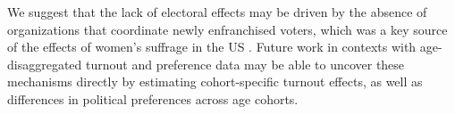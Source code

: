 We suggest that the lack of electoral effects may be driven by the
absence of organizations that coordinate newly enfranchised voters,
which was a key source of the effects of women's suffrage in the US
\parencite{Morgan-Collins2021-yq}. Future work in contexts with
age-disaggregated turnout and preference data may be able to uncover
these mechanisms directly by estimating cohort-specific turnout
effects, as well as differences in political preferences across age
cohorts.


